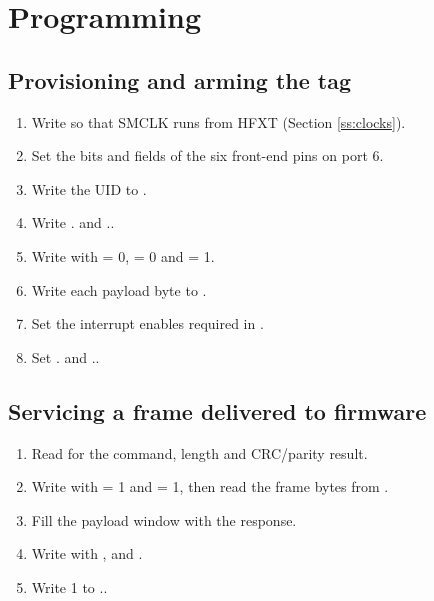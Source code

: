 \section{Programming}

\subsection{Provisioning and arming the tag}

\begin{enumerate}
	\item Write  so that SMCLK runs from HFXT (Section \ref{ss:clocks}).
	\item Set the  bits and  fields of the six front-end pins on port 6.
	\item Write the UID to .
	\item Write . and ..
	\item Write  with  = 0,  = 0 and  = 1.
	\item Write each payload byte to .
	\item Set the interrupt enables required in .
	\item Set . and ..
\end{enumerate}

\subsection{Servicing a frame delivered to firmware}

\begin{enumerate}
	\item Read  for the command, length and CRC/parity result.
	\item Write  with  = 1 and  = 1, then read the frame bytes from .
	\item Fill the payload window with the response.
	\item Write  with ,  and .
	\item Write 1 to ..
\end{enumerate}

